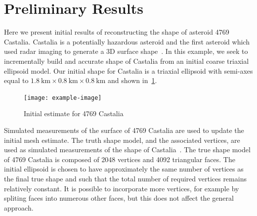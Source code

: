 \documentclass[letterpaper, paper,11pt]{AAS}		%
\begin{document}
\section{Preliminary Results}
Here we present initial results of reconstructing the shape of asteroid 4769 Castalia.
Castalia is a potentially  hazardous asteroid and the first asteroid which used radar imaging to generate a 3D surface shape~\cite{hudson1994}.
In this example, we seek to incrementally build and accurate shape of Castalia from an initial coarse triaxial ellipsoid model.
Our initial shape for Castalia is a triaxial ellipsoid with semi-axes equal to \( \SI{1.8}{\kilo\meter} \times \SI{0.8}{\kilo\meter} \times \SI{0.8}{\kilo\meter}\) and shown in~\cref{fig:initial_mesh}.
\begin{figure}[h]
    \centering
    \texttt{[image: example-image]}
    \caption{Initial estimate for 4769 Castalia~\label{fig:initial_mesh}}
\end{figure}
Simulated measurements of the surface of 4769 Castalia are used to update the initial mesh estimate.
The truth shape model, and the associated vertices, are used as simulated measurements of the shape of Castalia~\cite{neese2004}.
The true shape model of 4769 Castalia is composed of \num{2048} vertices and \num{4092} triangular faces.
The initial ellipsoid is chosen to have approximately the same number of vertices as the final true shape and such that the total number of required vertices remains relatively constant.
It is possible to incorporate more vertices, for example by spliting faces into numerous other faces, but this does not affect the general approach.
\end{document}
